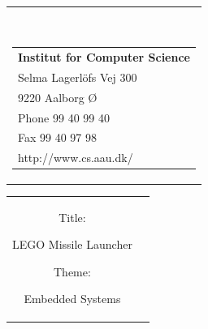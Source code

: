 

{}
\thispagestyle{empty}
\begin{nopagebreak}
{\samepage 
\begin{tabular}{r}
\parbox{\textwidth}{  \\
\hfill \parbox{8cm}{\begin{tabular}{l} %
{\small \textbf{Institut for Computer Science}}\\
{\small Selma Lagerlöfs Vej 300} \\
{\small 9220 Aalborg Ø} \\
{\small Phone 99 40 99 40} \\
{\small Fax 99 40 97 98} \\
{\small http://www.cs.aau.dk/}
\end{tabular}}}

\end{tabular}

\begin{tabular}{cc}
\parbox{7cm}{
\begin{description}

\item { Title:} 

LEGO Missile Launcher \\
  
\item { Theme:} 

Embedded Systems

\end{description}

\parbox{8cm}{

}}
\end{tabular}}
\end{nopagebreak}
